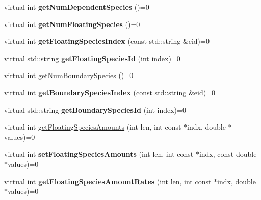 \begin{DoxyCompactItemize}
\item 
\hypertarget{classrr_1_1_executable_model_a5654c9ac88bf580d0f8be22c4feb4e3b}{virtual int {\bfseries get\-Num\-Dependent\-Species} ()=0}\label{classrr_1_1_executable_model_a5654c9ac88bf580d0f8be22c4feb4e3b}

\item 
\hypertarget{classrr_1_1_executable_model_aa2999a84a5a0d691dc08f3f78b94636d}{virtual int {\bfseries get\-Num\-Floating\-Species} ()=0}\label{classrr_1_1_executable_model_aa2999a84a5a0d691dc08f3f78b94636d}

\item 
\hypertarget{classrr_1_1_executable_model_a390a1905aabac6056f6dceff11833c43}{virtual int {\bfseries get\-Floating\-Species\-Index} (const std\-::string \&eid)=0}\label{classrr_1_1_executable_model_a390a1905aabac6056f6dceff11833c43}

\item 
\hypertarget{classrr_1_1_executable_model_aed1e27797613d3d1814e793562c1651d}{virtual std\-::string {\bfseries get\-Floating\-Species\-Id} (int index)=0}\label{classrr_1_1_executable_model_aed1e27797613d3d1814e793562c1651d}

\item 
virtual int \hyperlink{classrr_1_1_executable_model_a6ee272090a6b7a4a6808f091c1930495}{get\-Num\-Boundary\-Species} ()=0
\item 
\hypertarget{classrr_1_1_executable_model_a28488139fa975776eded9e8c899c307d}{virtual int {\bfseries get\-Boundary\-Species\-Index} (const std\-::string \&eid)=0}\label{classrr_1_1_executable_model_a28488139fa975776eded9e8c899c307d}

\item 
\hypertarget{classrr_1_1_executable_model_ac63e324e4b7a5d73e46e5e8e6dde35ec}{virtual std\-::string {\bfseries get\-Boundary\-Species\-Id} (int index)=0}\label{classrr_1_1_executable_model_ac63e324e4b7a5d73e46e5e8e6dde35ec}

\item 
virtual int \hyperlink{classrr_1_1_executable_model_a02631a01d09aec3d02aca92cbebff2f0}{get\-Floating\-Species\-Amounts} (int len, int const $\ast$indx, double $\ast$values)=0
\item 
\hypertarget{classrr_1_1_executable_model_a25756080098404468d13fcff06c2b263}{virtual int {\bfseries set\-Floating\-Species\-Amounts} (int len, int const $\ast$indx, const double $\ast$values)=0}\label{classrr_1_1_executable_model_a25756080098404468d13fcff06c2b263}

\item 
\hypertarget{classrr_1_1_executable_model_a326d0bdea2730e5d1541decec396462c}{virtual int {\bfseries get\-Floating\-Species\-Amount\-Rates} (int len, int const $\ast$indx, double $\ast$values)=0}\label{classrr_1_1_executable_model_a326d0bdea2730e5d1541decec396462c}


\end{DoxyCompactItemize}
